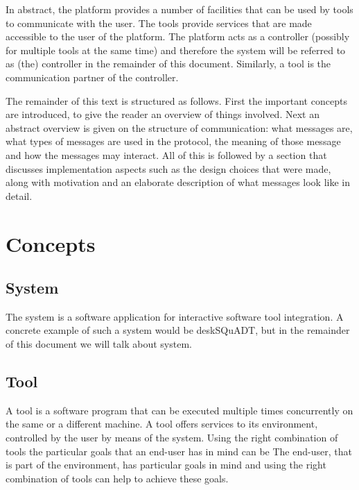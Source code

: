 \documentclass{article}
\begin{document}
  In abstract, the platform provides a number of facilities that can be used by
  tools to communicate with the user. The tools provide services that are made
  accessible to the user of the platform. The platform acts as a controller
  (possibly for multiple tools at the same time) and therefore the system will
  be referred to as (the) controller in the remainder of this document.
  Similarly, a tool is the communication partner of the controller.

  The remainder of this text is structured as follows. First the important
  concepts are introduced, to give the reader an overview of things involved.
  Next an abstract overview is given on the structure of communication: what
  messages are, what types of messages are used in the protocol, the meaning of
  those message and how the messages may interact. All of this is followed by a
  section that discusses implementation aspects such as the design choices that
  were made, along with motivation and an elaborate description of what
  messages look like in detail.

 \section{Concepts}

  \subsection{System}

   The system is a software application for interactive software tool
   integration. A concrete example of such a system would be deskSQuADT, but in
   the remainder of this document we will talk about system.

   
   
  \subsection{Tool}

   A tool is a software program that can be executed multiple times
   concurrently on the same or a different machine.  A tool offers services
   to its environment, controlled by the user by means of the system. Using the right combination of tools the particular goals that an end-user has in mind can be The
   end-user, that is part of the environment, has particular goals in mind and
   using the right combination of tools can help to achieve these goals.
\end{document}
